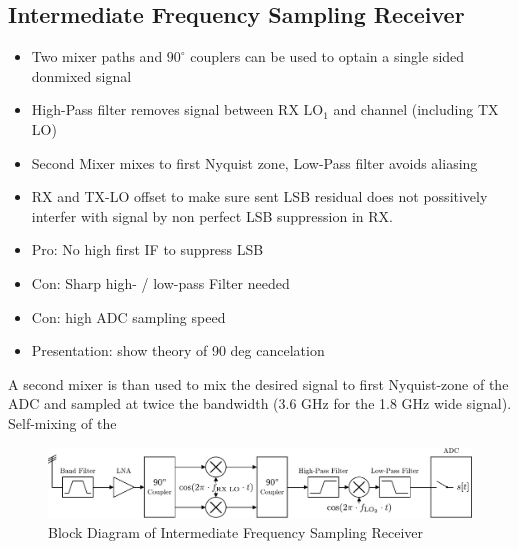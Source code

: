 \subsection{Intermediate Frequency Sampling Receiver}
\label{sec:rx_1}
\begin{itemize}
\item Two mixer paths and $90^\circ$ couplers can be used to optain a
  single sided donmixed signal
\item High-Pass filter removes signal between RX $\text{LO}_1$ and channel (including TX LO)
\item Second Mixer mixes to first Nyquist zone, Low-Pass filter avoids aliasing
\item RX and TX-LO offset to make sure sent LSB residual does not possitively
  interfer with signal by non perfect LSB suppression in RX.
\item Pro: No high first IF to suppress LSB
\item Con: Sharp high- / low-pass Filter needed
\item Con: high ADC sampling speed
\item Presentation: show theory of 90 deg cancelation
\end{itemize}

A second mixer is than used to mix the desired signal to first Nyquist-zone
of the ADC and sampled at twice the bandwidth
(3.6 GHz for the 1.8 GHz wide signal). Self-mixing of the

\begin{figure}[ht]
  \centering
  \includegraphics[width=\textwidth]{figures/rx_1_bd}
  \caption{Block Diagram of Intermediate Frequency Sampling Receiver}
  \label{fig:rx_1_bd}
\end{figure}

